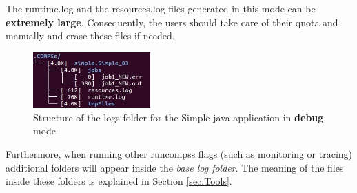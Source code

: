 The runtime.log and the resources.log files generated in this mode can be \textbf{extremely large}. Consequently, the users should
take care of their quota and manually and erase these files if needed. \newline

\begin{figure}[h!]
  \centering
    \includegraphics[width=0.4\textwidth]{./Sections/3_Results_and_Logs/Figures/simple_log_debug.jpeg}
    \caption{Structure of the logs folder for the Simple java application in \textbf{debug} mode}
    \label{fig:simple_log_debug}
\end{figure}

Furthermore, when running other runcompss flags (such as monitoring or tracing) additional folders will appear inside the 
\textit{base log folder}. The meaning of the files inside these folders is explained in Section \ref{sec:Tools}. 

